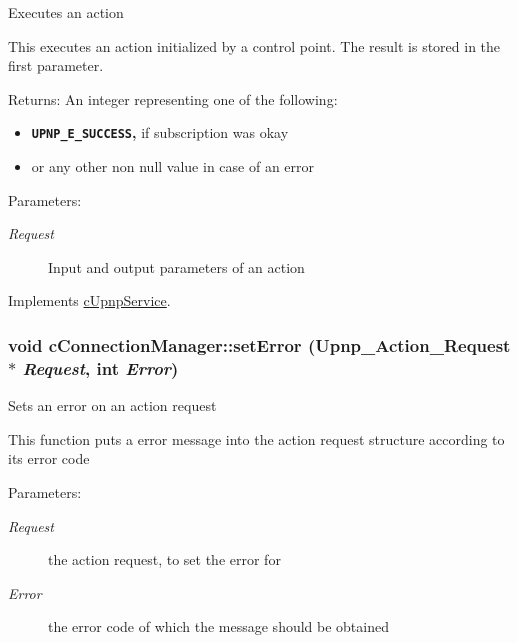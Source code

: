 Executes an action

This executes an action initialized by a control point. The result is stored in the first parameter.

\begin{Desc}
\item[Returns:]An integer representing one of the following:\begin{itemize}
\item {\bf {\tt UPNP\_\-E\_\-SUCCESS},} if subscription was okay\item or any other non null value in case of an error\end{itemize}
\end{Desc}
\begin{Desc}
\item[Parameters:]
\begin{description}
\item[{\em Request}]Input and output parameters of an action \end{description}
\end{Desc}
 

Implements \hyperlink{classcUpnpService_bbffca233e6aa193eda223cb7bfc2917}{cUpnpService}.\hypertarget{classcConnectionManager_02014a637c6cb04cbfe10b3cb4ce6d1d}{
\subsubsection[{setError}]{\setlength{\rightskip}{0pt plus 5cm}void cConnectionManager::setError (Upnp\_\-Action\_\-Request $\ast$ {\em Request}, \/  int {\em Error})}}
\label{classcConnectionManager_02014a637c6cb04cbfe10b3cb4ce6d1d}


Sets an error on an action request

This function puts a error message into the action request structure according to its error code

\begin{Desc}
\item[Parameters:]
\begin{description}
\item[{\em Request}]the action request, to set the error for \item[{\em Error}]the error code of which the message should be obtained \end{description}
\end{Desc}
 


